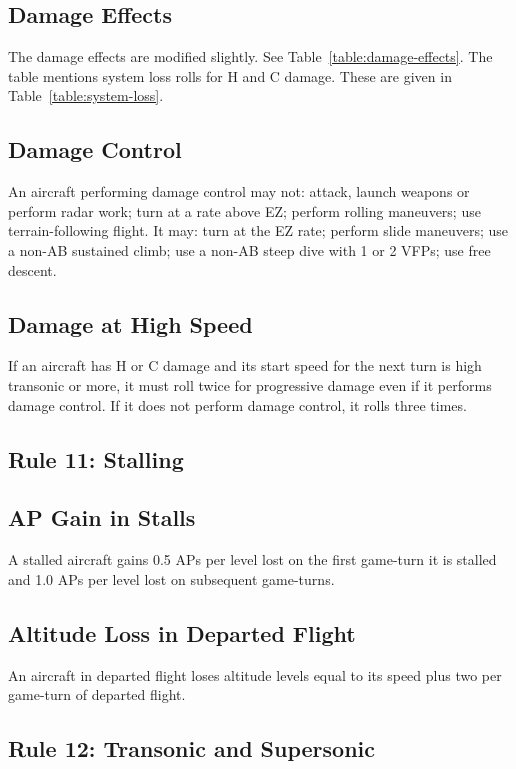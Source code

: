 \documentclass[10pt]{article}
\begin{document}
\subsection{Damage Effects} The damage effects are modified slightly. See Table~\ref{table:damage-effects}. The table mentions system loss rolls for H and C damage. These are given in Table~\ref{table:system-loss}. 

\subsection{Damage Control} An aircraft performing damage control may not: attack, launch weapons or perform radar work; turn at a rate above EZ; perform rolling maneuvers; use terrain-following flight. It may: turn at the EZ rate; perform slide maneuvers; use a non-AB sustained climb; use a non-AB steep dive with 1 or 2 VFPs; use free descent.

\subsection{Damage at High Speed} If an aircraft has H or C damage and its start speed for the next turn is high transonic or more, it must roll twice for progressive damage even if it performs damage control. If it does not perform damage control, it rolls three times.

\subsection{Rule 11: Stalling}

\subsection{AP Gain in Stalls} A stalled aircraft gains 0.5 APs per level lost on the first game-turn it is stalled and 1.0 APs per level lost on subsequent game-turns.

\subsection{Altitude Loss in Departed Flight} An aircraft in departed flight loses altitude levels equal to its speed plus two per game-turn of departed flight.

\subsection{Rule 12: Transonic and Supersonic}
\end{document}
